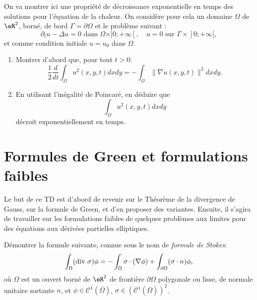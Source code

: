 \medskip

\begin{exercice}\label{exoChEDP_ChaleurProp}

On va montrer ici une propriété de décroissance exponentielle en temps des solutions pour l'équation de la chaleur. On considère pour cela un domaine $\Omega$ de $\eR^2$, borné, de bord $\Gamma = \partial \Omega$ et le problème suivant : 
\[
\partial_t u - \Delta u = 0 \mbox{ dans } \Omega \times ]0;+\infty[, \quad u = 0 \mbox{ sur } \Gamma \times ]0;+\infty[,
\]
et comme condition initiale $u = u_0$ dans $\Omega$.

\begin{enumerate}

\item Montrer d'abord que, pour tout $t>0$:
\[
\frac12 \frac{d}{dt} \int_\Omega u^2(x,y,t) dxdy = - \int_\Omega \| \nabla u (x,y,t) \|^2 dx dy.
\]

\item En utilisant l'inégalité de Poincaré, en déduire que 
\[
\int_\Omega u^2(x,y,t) dxdy
\]
décroit exponentiellement en temps.

\end{enumerate}

\end{exercice}


\newpage

\section{Formules de Green et formulations faibles}

Le but de ce TD est d'abord de revenir sur le Théorème de la divergence de Gauss, sur la formule de Green, et d'en proposer des variantes. Ensuite, il s'agira de travailler sur les formulations faibles de quelques problèmes aux limites pour des équations aux dérivées partielles elliptiques.

\bigskip

\begin{exercice}\label{exoChWeak_Stokes}

Démontrer la formule suivante, connue sous le nom de \emph{formule de Stokes}:
\[
\int_\Omega ( \hbox{div } \sigma ) \phi 
= 
- \int_\Omega \sigma \cdot ( \nabla \phi ) 
+ \int_{\partial \Omega} (\sigma \cdot n) \phi,
\]
où $\Omega$ est un ouvert borné de $\eR^2$ de frontière $\partial \Omega$ polygonale ou lisse, de normale unitaire sortante $n$, et $\phi \in \mathcal{C}^1(\overline{\Omega})$, $\sigma \in ( \mathcal{C}^1(\overline{\Omega}) )^2$. 

\end{exercice}

